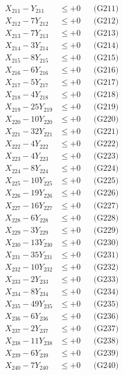 \documentclass[a4paper,10pt]{article}
\begin{document}
{\begin{align}
X_{211} - Y_{211} &\leq +0 && \text{(G211)} \\
X_{212} - 7Y_{212} &\leq +0 && \text{(G212)} \\
X_{213} - 7Y_{213} &\leq +0 && \text{(G213)} \\
\allowbreak
X_{214} - 3Y_{214} &\leq +0 && \text{(G214)} \\
X_{215} - 8Y_{215} &\leq +0 && \text{(G215)} \\
X_{216} - 6Y_{216} &\leq +0 && \text{(G216)} \\
X_{217} - 5Y_{217} &\leq +0 && \text{(G217)} \\
X_{218} - 4Y_{218} &\leq +0 && \text{(G218)} \\
X_{219} - 25Y_{219} &\leq +0 && \text{(G219)} \\
X_{220} - 10Y_{220} &\leq +0 && \text{(G220)} \\
X_{221} - 32Y_{221} &\leq +0 && \text{(G221)} \\
X_{222} - 4Y_{222} &\leq +0 && \text{(G222)} \\
X_{223} - 4Y_{223} &\leq +0 && \text{(G223)} \\
\allowbreak
X_{224} - 8Y_{224} &\leq +0 && \text{(G224)} \\
X_{225} - 10Y_{225} &\leq +0 && \text{(G225)} \\
X_{226} - 19Y_{226} &\leq +0 && \text{(G226)} \\
X_{227} - 16Y_{227} &\leq +0 && \text{(G227)} \\
X_{228} - 6Y_{228} &\leq +0 && \text{(G228)} \\
X_{229} - 3Y_{229} &\leq +0 && \text{(G229)} \\
X_{230} - 13Y_{230} &\leq +0 && \text{(G230)} \\
X_{231} - 35Y_{231} &\leq +0 && \text{(G231)} \\
X_{232} - 10Y_{232} &\leq +0 && \text{(G232)} \\
X_{233} - 2Y_{233} &\leq +0 && \text{(G233)} \\
\allowbreak
X_{234} - 8Y_{234} &\leq +0 && \text{(G234)} \\
X_{235} - 49Y_{235} &\leq +0 && \text{(G235)} \\
X_{236} - 6Y_{236} &\leq +0 && \text{(G236)} \\
X_{237} - 2Y_{237} &\leq +0 && \text{(G237)} \\
X_{238} - 11Y_{238} &\leq +0 && \text{(G238)} \\
X_{239} - 6Y_{239} &\leq +0 && \text{(G239)} \\
X_{240} - 7Y_{240} &\leq +0 && \text{(G240)} \\

\end{align}}
\end{document}
